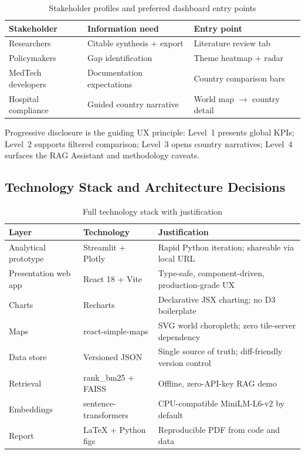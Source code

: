 \begin{table}[htbp]
\centering
\caption{Stakeholder profiles and preferred dashboard entry points}
\label{tab:stakeholders}
\begin{tabular}{@{}p{3.0cm}p{4.0cm}p{4.2cm}@{}}
\toprule
\textbf{Stakeholder} & \textbf{Information need} & \textbf{Entry point} \\
\midrule
Researchers & Citable synthesis + export & Literature review tab \\
Policymakers & Gap identification & Theme heatmap + radar \\
MedTech developers & Documentation expectations & Country comparison bars \\
Hospital compliance & Guided country narrative & World map $\to$ country detail \\
\bottomrule
\end{tabular}
\end{table}

Progressive disclosure is the guiding UX principle: Level~1 presents global KPIs;
Level~2 supports filtered comparison; Level~3 opens country narratives; Level~4
surfaces the RAG Assistant and methodology caveats.

\subsection{Technology Stack and Architecture Decisions}
\label{sec:dash-stack}

\begin{table}[htbp]
\centering
\caption{Full technology stack with justification}
\label{tab:tech-stack}
\begin{tabular}{@{}p{2.8cm}p{2.6cm}p{5.8cm}@{}}
\toprule
\textbf{Layer} & \textbf{Technology} & \textbf{Justification} \\
\midrule
Analytical prototype & Streamlit + Plotly & Rapid Python iteration; shareable via local URL \\
Presentation web app & React 18 + Vite & Type-safe, component-driven, production-grade UX \\
Charts & Recharts & Declarative JSX charting; no D3 boilerplate \\
Maps & react-simple-maps & SVG world choropleth; zero tile-server dependency \\
Data store & Versioned JSON & Single source of truth; diff-friendly version control \\
Retrieval & rank\_bm25 + FAISS & Offline, zero-API-key RAG demo \\
Embeddings & sentence-transformers & CPU-compatible MiniLM-L6-v2 by default \\
Report & \LaTeX{} + Python figs & Reproducible PDF from code and data \\
\bottomrule
\end{tabular}
\end{table}

